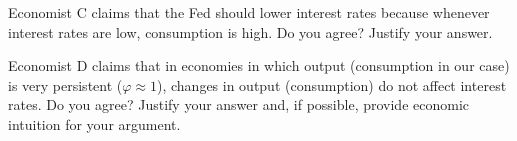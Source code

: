  Economist C claims that the Fed should lower interest rates because
whenever interest rates are low, consumption is high.  Do you agree?  Justify
your answer.
\medskip

 Economist D claims that in economies in which output (consumption
in our case) is very persistent %
($\varphi \approx 1$), changes in output (consumption) do not affect
interest rates.  Do you agree?  Justify your answer and, if possible,
provide economic intuition for your argument.



\medskip

